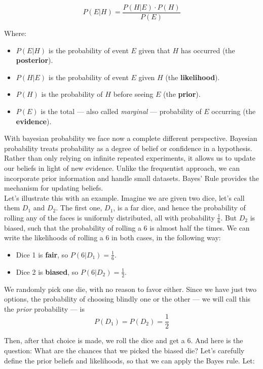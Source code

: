 \documentclass{book}
\begin{document}
\begin{equation}
P(E|H) = \frac{P(H|E) \cdot P(H)}{P(E)}
\end{equation}

Where:
\begin{itemize}
  \item $P(E|H)$ is the probability of event $E$ given that $H$ has occurred (the \textbf{posterior}).
  \item $P(H|E)$ is the probability of event $E$ given $H$ (the \textbf{likelihood}).
  \item $P(H)$ is the probability of $H$ before seeing $E$ (the \textbf{prior}).
  \item $P(E)$ is the total — also called \textit{marginal} — probability of $E$ occurring (the \textbf{evidence}).
\end{itemize}

With bayesian probability we face now a complete different perspective. Bayesian probability treats probability as a degree of belief or confidence in a hypothesis. Rather than only relying on infinite repeated experiments, it allows us to update our beliefs in light of new evidence. Unlike the frequentist approach, we can incorporate prior information and handle small datasets. Bayes’ Rule provides the mechanism for updating beliefs.\\

Let's illustrate this with an example. Imagine we are given two dice, let's call them $D_1$ and $D_2$. The first one, $D_1$, is a far dice, and hence the probability of rolling any of the faces is uniformly distributed, all with probability $\frac{1}{6}$. But $D_2$ is biased, such that the probability of rolling a 6 is almost half the times. We can write the likelihoods of rolling a 6 in both cases, in the following way:
\begin{itemize}
  \item Dice 1 is \textbf{fair}, so $P(6|D_1) = \frac{1}{6}$.
  \item Dice 2 is \textbf{biased}, so $P(6|D_2) = \frac{1}{2}$.
\end{itemize}

We randomly pick one die, with no reason to favor either. Since we have just two options, the probability of choosing blindly one or the other — we will call this the \textit{prior} probability — is
\[
P(D_1) = P(D_2) = \frac{1}{2}
\]

Then, after that choice is made, we roll the dice and get a 6. And here is the question: What are the chances that we picked the biased die? Let's carefully define the prior beliefs and likelihoods, so that we can apply the Bayes rule. Let:
\end{document}
